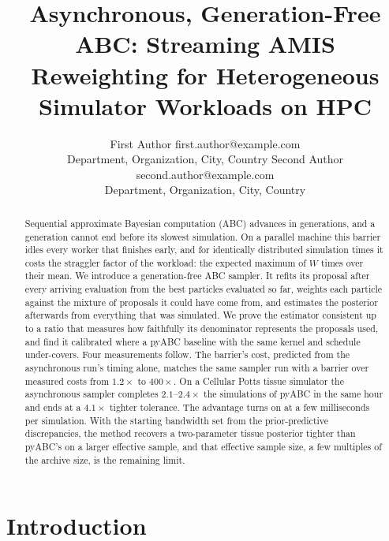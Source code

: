 \documentclass[10pt]{article}
\title{Asynchronous, Generation-Free ABC: Streaming AMIS Reweighting for Heterogeneous Simulator Workloads on HPC}
\author{\name First Author \email first.author@example.com \\
      \addr Department, Organization, City, Country
      \AND
      \name Second Author \email second.author@example.com \\
      \addr Department, Organization, City, Country}
\theoremstyle{plain}
\theoremstyle{definition}
\begin{document}
\maketitle

\begin{abstract}
Sequential approximate Bayesian computation (ABC) advances in generations, and a generation cannot end before its slowest simulation. On a parallel machine this barrier idles every worker that finishes early, and for identically distributed simulation times it costs the straggler factor of the workload: the expected maximum of $W$ times over their mean. We introduce a generation-free ABC sampler. It refits its proposal after every arriving evaluation from the best particles evaluated so far, weights each particle against the mixture of proposals it could have come from, and estimates the posterior afterwards from everything that was simulated. We prove the estimator consistent up to a ratio that measures how faithfully its denominator represents the proposals used, and find it calibrated where a pyABC baseline with the same kernel and schedule under-covers. Four measurements follow. The barrier's cost, predicted from the asynchronous run's timing alone, matches the same sampler run with a barrier over measured costs from $1.2\times$ to $400\times$. On a Cellular Potts tissue simulator the asynchronous sampler completes $2.1$--$2.4\times$ the simulations of pyABC in the same hour and ends at a $4.1\times$ tighter tolerance. The advantage turns on at a few milliseconds per simulation. With the starting bandwidth set from the prior-predictive discrepancies, the method recovers a two-parameter tissue posterior tighter than pyABC's on a larger effective sample, and that effective sample size, a few multiples of the archive size, is the remaining limit.
\end{abstract}

\section{Introduction}\label{sec:introduction}
\end{document}
